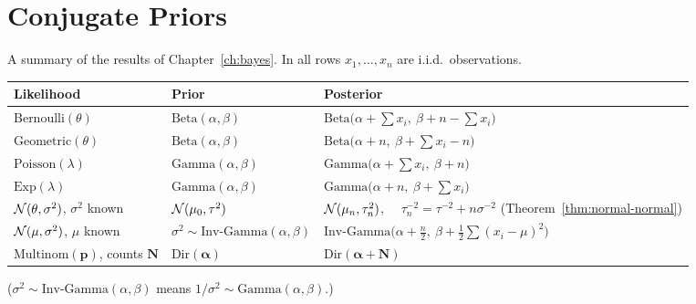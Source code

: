 \documentclass[main.tex]{subfiles}
\begin{document}
\section{Conjugate Priors}

A summary of the results of Chapter~\ref{ch:bayes}. In all rows $x_1,\dots,x_n$ are i.i.d.\ observations.

{\small
\renewcommand{\arraystretch}{1.6}
\begin{center}
\begin{tabular}{@{}lll@{}}
\toprule
\textbf{Likelihood} & \textbf{Prior} & \textbf{Posterior} \\
\midrule
$\text{Bernoulli}(\theta)$ & $\text{Beta}(\alpha,\beta)$ & $\text{Beta}\big(\alpha+\sum x_i,\ \beta+n-\sum x_i\big)$ \\
$\text{Geometric}(\theta)$ & $\text{Beta}(\alpha,\beta)$ & $\text{Beta}\big(\alpha+n,\ \beta+\sum x_i-n\big)$ \\
$\text{Poisson}(\lambda)$ & $\text{Gamma}(\alpha,\beta)$ & $\text{Gamma}\big(\alpha+\sum x_i,\ \beta+n\big)$ \\
$\text{Exp}(\lambda)$ & $\text{Gamma}(\alpha,\beta)$ & $\text{Gamma}\big(\alpha+n,\ \beta+\sum x_i\big)$ \\
$\mathcal{N}(\theta,\sigma^2)$, $\sigma^2$ known & $\mathcal{N}(\mu_0,\tau^2)$ & $\mathcal{N}(\mu_n,\tau_n^2)$, \ \ $\tau_n^{-2}=\tau^{-2}+n\sigma^{-2}$ (Theorem~\ref{thm:normal-normal}) \\
$\mathcal{N}(\mu,\sigma^2)$, $\mu$ known & $\sigma^2\sim\text{Inv-Gamma}(\alpha,\beta)$ & $\text{Inv-Gamma}\big(\alpha+\frac n2,\ \beta+\frac12\sum(x_i-\mu)^2\big)$ \\
$\text{Multinom}(\mathbf p)$, counts $\mathbf N$ & $\text{Dir}(\bm\alpha)$ & $\text{Dir}(\bm\alpha+\mathbf N)$ \\
\bottomrule
\end{tabular}
\end{center}
}
\noindent ($\sigma^2\sim\text{Inv-Gamma}(\alpha,\beta)$ means $1/\sigma^2\sim\text{Gamma}(\alpha,\beta)$.)
\end{document}
